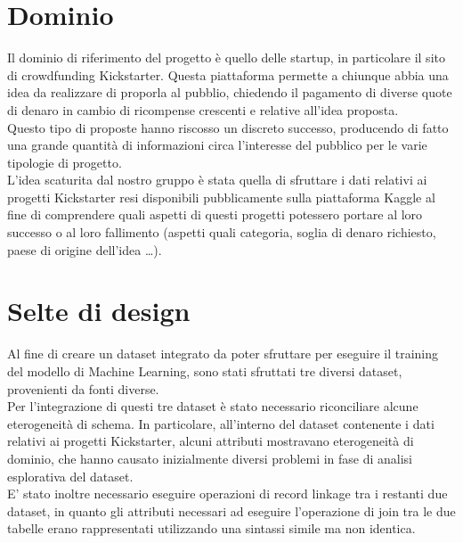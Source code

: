 \section{Dominio}
Il dominio di riferimento del progetto è quello delle startup, in particolare il sito di crowdfunding Kickstarter. Questa piattaforma permette a chiunque abbia una idea da realizzare di proporla al pubblio, chiedendo il pagamento di diverse quote di denaro in cambio di ricompense crescenti e relative all'idea proposta.\\
Questo tipo di proposte hanno riscosso un discreto successo, producendo di fatto una grande quantità di informazioni circa l'interesse del pubblico per le varie tipologie di progetto.\\
L'idea scaturita dal nostro gruppo è stata quella di sfruttare i dati relativi ai progetti Kickstarter resi disponibili pubblicamente sulla piattaforma Kaggle al fine di comprendere quali aspetti di questi progetti potessero portare al loro successo o al loro fallimento (aspetti quali categoria, soglia di denaro richiesto, paese di origine dell'idea \dots).

\section{Selte di design}
Al fine di creare un dataset integrato da poter sfruttare per eseguire il training del modello di Machine Learning, sono stati sfruttati tre diversi dataset, provenienti da fonti diverse.\\
Per l'integrazione di questi tre dataset è stato necessario riconciliare alcune eterogeneità di schema. In particolare, all'interno del dataset contenente i dati relativi ai progetti Kickstarter, alcuni attributi mostravano eterogeneità di dominio, che hanno causato inizialmente diversi problemi in fase di analisi esplorativa del dataset.\\
E' stato inoltre necessario eseguire operazioni di record linkage tra i restanti due dataset, in quanto gli attributi necessari ad eseguire l'operazione di join tra le due tabelle erano rappresentati utilizzando una sintassi simile ma non identica.